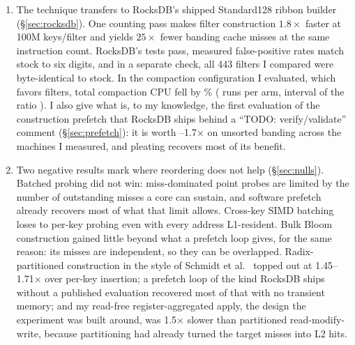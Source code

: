 \documentclass{article}
\begin{document}
\begin{enumerate}
\item The technique transfers to RocksDB's shipped Standard128 ribbon builder (\S\ref{sec:rocksdb}). One counting pass makes filter construction $1.8\times$ faster at 100M keys/filter and yields $25\times$ fewer banding cache misses at the same instruction count. RocksDB's tests pass, measured false-positive rates match stock to six digits, and in a separate check, all 443 filters I compared were byte-identical to stock. In the compaction configuration I evaluated, which favors filters, total compaction CPU fell by \esevencompreduction\% (\esevencompreps{} runs per arm, interval of the ratio \esevencompci). I also give what is, to my knowledge, the first evaluation of the construction prefetch that RocksDB ships behind a ``TODO: verify/validate'' comment (\S\ref{sec:prefetch}): it is worth \esevenprefetchgainarm--1.7$\times$ on unsorted banding across the machines I measured, and pleating recovers most of its benefit.
\item Two negative results mark where reordering does not help (\S\ref{sec:nulls}). Batched probing did not win: miss-dominated point probes are limited by the number of outstanding misses a core can sustain, and software prefetch already recovers most of what that limit allows. Cross-key SIMD batching loses to per-key probing even with every address L1-resident. Bulk Bloom construction gained little beyond what a prefetch loop gives, for the same reason: its misses are independent, so they can be overlapped. Radix-partitioned construction in the style of Schmidt et al.~\citep{schmidt2021partitioned} topped out at 1.45--1.71$\times$ over per-key insertion; a prefetch loop of the kind RocksDB ships without a published evaluation recovered most of that with no transient memory; and my read-free register-aggregated apply, the design the experiment was built around, was 1.5$\times$ slower than partitioned read-modify-write, because partitioning had already turned the target misses into L2 hits.
\end{enumerate}
\end{document}
